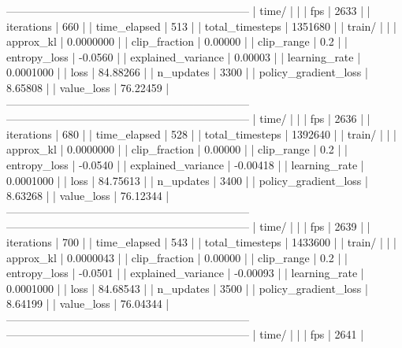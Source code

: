 ------------------------------------------------------------------
| time/                   |              |
|    fps                  |         2633 |
|    iterations           |          660 |
|    time_elapsed         |          513 |
|    total_timesteps      |      1351680 |
| train/                  |              |
|    approx_kl            |    0.0000000 |
|    clip_fraction        |      0.00000 |
|    clip_range           |          0.2 |
|    entropy_loss         |      -0.0560 |
|    explained_variance   |      0.00003 |
|    learning_rate        |    0.0001000 |
|    loss                 |     84.88266 |
|    n_updates            |         3300 |
|    policy_gradient_loss |      8.65808 |
|    value_loss           |     76.22459 |
------------------------------------------------------------------
------------------------------------------------------------------
| time/                   |              |
|    fps                  |         2636 |
|    iterations           |          680 |
|    time_elapsed         |          528 |
|    total_timesteps      |      1392640 |
| train/                  |              |
|    approx_kl            |    0.0000000 |
|    clip_fraction        |      0.00000 |
|    clip_range           |          0.2 |
|    entropy_loss         |      -0.0540 |
|    explained_variance   |     -0.00418 |
|    learning_rate        |    0.0001000 |
|    loss                 |     84.75613 |
|    n_updates            |         3400 |
|    policy_gradient_loss |      8.63268 |
|    value_loss           |     76.12344 |
------------------------------------------------------------------
------------------------------------------------------------------
| time/                   |              |
|    fps                  |         2639 |
|    iterations           |          700 |
|    time_elapsed         |          543 |
|    total_timesteps      |      1433600 |
| train/                  |              |
|    approx_kl            |    0.0000043 |
|    clip_fraction        |      0.00000 |
|    clip_range           |          0.2 |
|    entropy_loss         |      -0.0501 |
|    explained_variance   |     -0.00093 |
|    learning_rate        |    0.0001000 |
|    loss                 |     84.68543 |
|    n_updates            |         3500 |
|    policy_gradient_loss |      8.64199 |
|    value_loss           |     76.04344 |
------------------------------------------------------------------
------------------------------------------------------------------
| time/                   |              |
|    fps                  |         2641 |
